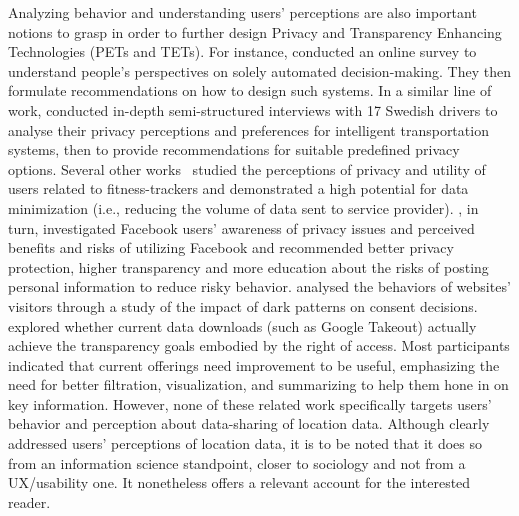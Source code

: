 
Analyzing behavior and understanding users' perceptions are also important notions to grasp in order to further design Privacy and Transparency Enhancing Technologies (PETs and TETs).
For instance, 
\cite{274429} conducted an online survey to understand people’s perspectives on solely automated decision-making. They then formulate recommendations on how to design such systems.
In a similar line of work, 
\cite{islami_capturing_2022} conducted in-depth semi-structured interviews with 17 Swedish drivers to analyse their privacy perceptions and preferences for intelligent transportation systems, then to provide recommendations for suitable predefined privacy options.
Several other works~\cite{DBLP:journals/popets/ZuffereyNHH23,DBLP:journals/imwut/VelykoivanenkoN21, 10.1145/3491102.3502136} studied the perceptions of privacy and utility of users related to fitness-trackers and demonstrated a high potential for data minimization (i.e., reducing the volume of data sent to service provider).
\cite{10.1111/j.1083-6101.2009.01494.x}, in turn, investigated Facebook users' awareness of privacy issues and perceived benefits and risks of utilizing Facebook and recommended better privacy protection, higher transparency and more education about the risks of posting personal information to reduce risky behavior. 
\cite{bielova:hal-04235032} analysed the behaviors of websites' visitors through a study of the impact of dark patterns on consent decisions. 
\cite{274435} explored whether current data downloads (such as Google Takeout) actually achieve the transparency goals embodied by the right of access. Most participants indicated that current offerings need improvement to be useful, emphasizing the need for better filtration, visualization, and summarizing to help them hone in on key information.
However, none of these related work specifically targets users' behavior and perception about data-sharing of location data.
Although 
\cite{martin_what_2019} clearly addressed users' perceptions of location data, it is to be noted that it does so from an information science standpoint, %
closer to sociology and not from a UX/usability one.
It nonetheless offers a relevant account for the interested reader.


